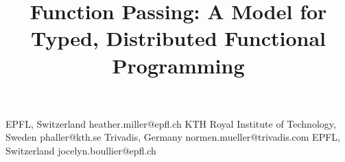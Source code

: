 \documentclass[10pt]{sigplanconf}
\theoremstyle{definition}
\theoremstyle{definition}
\begin{document}
\toappear{}

\setlength{\pdfpageheight}{\paperheight}
\setlength{\pdfpagewidth}{\paperwidth}

\setmainfont[Mapping=tex-text]{Times New Roman}
\setmonofont[Scale=0.8,BoldFont={Consolas Bold}]{Consolas}




\title{Function Passing: A Model for Typed, Distributed Functional Programming}

           {EPFL, Switzerland}
           {heather.miller@epfl.ch}
           {KTH Royal Institute of Technology, Sweden}
           {phaller@kth.se}
           {Trivadis, Germany}
           {normen.mueller@trivadis.com}
           {EPFL, Switzerland}
           {jocelyn.boullier@epfl.ch}

\maketitle
\end{document}
